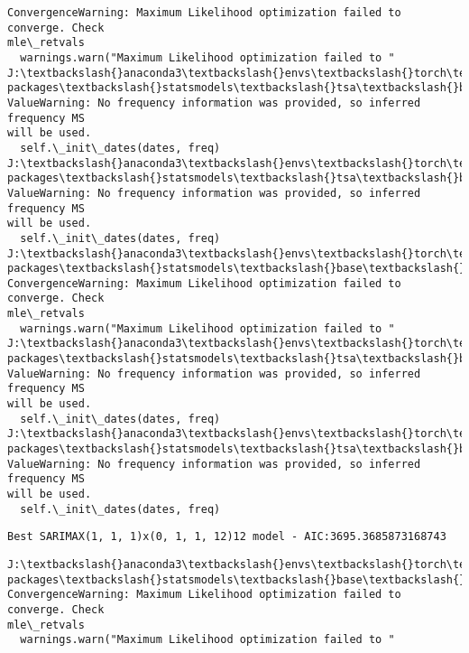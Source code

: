 \documentclass[11pt]{article}
\begin{document}
\begin{Verbatim}[commandchars=\\\{\}]
ConvergenceWarning: Maximum Likelihood optimization failed to converge. Check
mle\_retvals
  warnings.warn("Maximum Likelihood optimization failed to "
J:\textbackslash{}anaconda3\textbackslash{}envs\textbackslash{}torch\textbackslash{}Lib\textbackslash{}site-packages\textbackslash{}statsmodels\textbackslash{}tsa\textbackslash{}base\textbackslash{}tsa\_model.py:473:
ValueWarning: No frequency information was provided, so inferred frequency MS
will be used.
  self.\_init\_dates(dates, freq)
J:\textbackslash{}anaconda3\textbackslash{}envs\textbackslash{}torch\textbackslash{}Lib\textbackslash{}site-packages\textbackslash{}statsmodels\textbackslash{}tsa\textbackslash{}base\textbackslash{}tsa\_model.py:473:
ValueWarning: No frequency information was provided, so inferred frequency MS
will be used.
  self.\_init\_dates(dates, freq)
J:\textbackslash{}anaconda3\textbackslash{}envs\textbackslash{}torch\textbackslash{}Lib\textbackslash{}site-packages\textbackslash{}statsmodels\textbackslash{}base\textbackslash{}model.py:607:
ConvergenceWarning: Maximum Likelihood optimization failed to converge. Check
mle\_retvals
  warnings.warn("Maximum Likelihood optimization failed to "
J:\textbackslash{}anaconda3\textbackslash{}envs\textbackslash{}torch\textbackslash{}Lib\textbackslash{}site-packages\textbackslash{}statsmodels\textbackslash{}tsa\textbackslash{}base\textbackslash{}tsa\_model.py:473:
ValueWarning: No frequency information was provided, so inferred frequency MS
will be used.
  self.\_init\_dates(dates, freq)
J:\textbackslash{}anaconda3\textbackslash{}envs\textbackslash{}torch\textbackslash{}Lib\textbackslash{}site-packages\textbackslash{}statsmodels\textbackslash{}tsa\textbackslash{}base\textbackslash{}tsa\_model.py:473:
ValueWarning: No frequency information was provided, so inferred frequency MS
will be used.
  self.\_init\_dates(dates, freq)
    \end{Verbatim}

    \begin{Verbatim}[commandchars=\\\{\}]
Best SARIMAX(1, 1, 1)x(0, 1, 1, 12)12 model - AIC:3695.3685873168743
    \end{Verbatim}

    \begin{Verbatim}[commandchars=\\\{\}]
J:\textbackslash{}anaconda3\textbackslash{}envs\textbackslash{}torch\textbackslash{}Lib\textbackslash{}site-packages\textbackslash{}statsmodels\textbackslash{}base\textbackslash{}model.py:607:
ConvergenceWarning: Maximum Likelihood optimization failed to converge. Check
mle\_retvals
  warnings.warn("Maximum Likelihood optimization failed to "
    \end{Verbatim}
\end{document}
